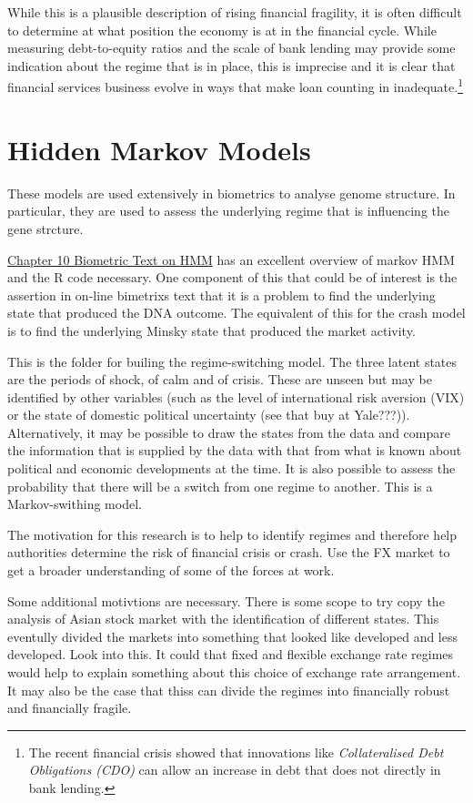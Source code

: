 \documentclass[12pt, a4paper, oneside]{article} %
\begin{document}
While this is a plausible description of rising financial fragility, it is often difficult to determine at what position the economy is at in the financial cycle.  While measuring debt-to-equity ratios and the scale of bank lending may provide some indication about the regime that is in place, this is imprecise and it is clear that financial services business evolve in ways that make loan counting in inadequate.\footnote{The recent financial crisis showed that innovations like \emph{Collateralised Debt Obligations (CDO)} can allow an increase in debt that does not directly in bank lending.}   

\section{Hidden Markov Models}
These models are used extensively in biometrics to analyse genome structure.  In particular, they are used to assess the underlying regime that is influencing the gene strcture. 

\href{http://a-little-book-of-r-for-bioinformatics.readthedocs.org/en/latest/src/chapter10.html}{Chapter 10 Biometric Text on HMM}
has an excellent overview of markov HMM and the R code necessary. One component of this that could be of interest is the assertion in on-line bimetrixs text that it is a problem to find the underlying state that produced the DNA outcome.  The equivalent of this for the crash model is to find the underlying Minsky state that produced the market activity. 

This is the folder for builing the regime-switching model. The three latent states are the periods of shock, of calm and of crisis.  These are unseen but may be identified by other variables (such as the level of international risk aversion (VIX) or the state of domestic political uncertainty (see that buy at Yale???)).  Alternatively, it may be possible to draw the states from the data and compare the information that is supplied by the data with that from what is known about political and economic developments at the time.  It is also possible to assess the probability that there will be a switch from one regime to another.  This is a Markov-swithing model. 

The motivation for this research is to help to identify regimes and therefore help authorities determine the risk of financial crisis or crash. Use the FX market to get a broader understanding of some of the forces at work.

Some additional motivtions are necessary. There is some scope to try copy the analysis of Asian stock market with the identification of different states.  This eventully divided the markets into something that looked like developed and less developed. Look into this.  It could that fixed and flexible exchange rate regimes would help to explain something about this choice of exchange rate arrangement.  It may also be the case that thiss can divide the regimes into financially robust and financially fragile. 
\end{document}
